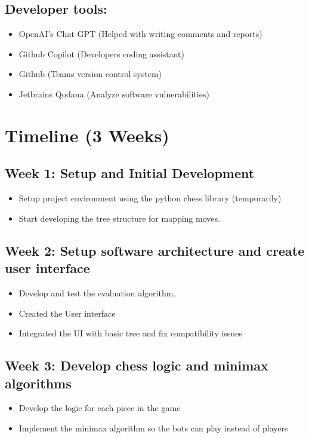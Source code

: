 \documentclass{article}
\begin{document}
\subsection*{Developer tools:}
\begin{itemize}
    \item OpenAI's Chat GPT (Helped with writing comments and reports)
    \item Github Copilot (Developers coding assistant)
    \item Github (Teams version control system)
    \item Jetbrains Qodana (Analyze software vulnerabilities)
\end{itemize}

\section*{Timeline (3 Weeks)}
\subsection*{Week 1: Setup and Initial Development}
\begin{itemize}
    \item Setup project environment using the python chess library (temporarily)
    \item Start developing the tree structure for mapping moves.
\end{itemize}
\subsection*{Week 2: Setup software architecture and create user interface}
\begin{itemize}
    \item Develop and test the evaluation algorithm.
    \item Created the User interface
    \item Integrated the UI with basic tree and fix compatibility issues
\end{itemize}
\subsection*{Week 3: Develop chess logic and minimax algorithms}
\begin{itemize}
    \item Develop the logic for each piece in the game
    \item Implement the minimax algorithm so the bots can play instead of players
\end{itemize}
\end{document}
